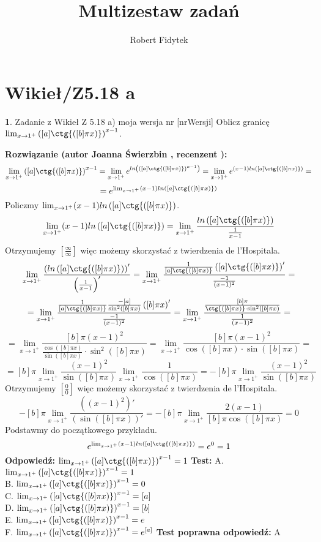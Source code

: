\documentclass[12pt, a4paper]{article}
\title{Multizestaw zadań}
\author{Robert Fidytek}
\date{}
\theoremstyle{definition} %
\newtheorem{zad}{}
\newcommand{\kategoria}[1]{\section{#1}} %
\newcommand{\zadStart}[1]{\begin{zad}#1\newline} %
\newcommand{\zadStop}{\end{zad}}   %
\newcommand{\rozwStart}[2]{\noindent \textbf{Rozwiązanie (autor #1 , recenzent #2): }\newline} %
\newcommand{\rozwStop}{\newline}                                            %
\newcommand{\odpStart}{\noindent \textbf{Odpowiedź:}\newline}    %
\newcommand{\odpStop}{\newline}                                             %
\newcommand{\testStart}{\noindent \textbf{Test:}\newline} %
\newcommand{\testStop}{\newline} %
\newcommand{\kluczStart}{\noindent \textbf{Test poprawna odpowiedź:}\newline} %
\newcommand{\kluczStop}{\newline} %
\begin{document}
\maketitle


\kategoria{Wikieł/Z5.18 a}
\zadStart{Zadanie z Wikieł Z 5.18 a) moja wersja nr [nrWersji]}
Oblicz granicę $\lim_{x \rightarrow 1^+} \left( [a] \ctg{([b] \pi x)} \right)^{x-1}$.
\zadStop
\rozwStart{Joanna Świerzbin}{}
$$ \lim_{x \rightarrow 1^+} \left( [a] \ctg{([b] \pi x)} \right)^{x-1} = \lim_{x \rightarrow 1^+} e^{ln \left(\left( [a] \ctg{([b] \pi x)} \right)^{x-1}\right)}
= \lim_{x \rightarrow 1^+} e^{(x-1) ln\left( [a] \ctg{([b] \pi x)} \right)}=$$
$$= e^{ \lim_{x \rightarrow 1^+} (x-1) ln\left( [a] \ctg{([b] \pi x)} \right)}$$
Policzmy $ \lim_{x \rightarrow 1^+} (x-1) ln\left( [a] \ctg{([b] \pi x)} \right)$.
$$\lim_{x \rightarrow 1^+} (x-1) ln\left( [a] \ctg{([b] \pi x)} \right) = \lim_{x \rightarrow 1^+} \frac{ln\left( [a] \ctg{([b] \pi x)} \right)}{\frac{1}{x-1}}$$
Otrzymujemy $ \left[ \frac{\infty}{\infty} \right] $ więc możemy skorzystać z twierdzenia de l'Hospitala.
$$\lim_{x \rightarrow 1^+} \frac{\left(ln\left( [a] \ctg{([b] \pi x)} \right)\right)'}{\left(\frac{1}{x-1}\right)'} = \lim_{x \rightarrow 1^+} \frac{\frac{1}{ [a] \ctg{([b] \pi x)}}\left( [a] \ctg{([b] \pi x)} \right)'}{\frac{-1}{(x-1)^2}}=$$
$$= \lim_{x \rightarrow 1^+} \frac{\frac{1}{ [a] \ctg{([b] \pi x)}}\frac{-[a]}{\sin^2([b] \pi x )}\left([b] \pi x\right)'}{\frac{-1}{(x-1)^2}}=
\lim_{x \rightarrow 1^+} \frac{\frac{[b] \pi}{ \ctg{([b] \pi x)} \cdot \sin^2([b] \pi x )}}{\frac{1}{(x-1)^2}}=$$
$$ = \lim_{x \rightarrow 1^+} \frac{[b] \pi (x-1)^2}{ \frac{\cos{([b] \pi x)}}{\sin([b] \pi x)} \cdot \sin^2([b] \pi x )}
= \lim_{x \rightarrow 1^+} \frac{[b] \pi (x-1)^2}{ \cos{([b] \pi x)} \cdot \sin([b] \pi x )}=$$
$$ =[b] \pi \lim_{x \rightarrow 1^+} \frac{(x-1)^2}{\sin([b] \pi x )}  \lim_{x \rightarrow 1^+} \frac{1}{\cos{([b] \pi x)}}=- [b] \pi \lim_{x \rightarrow 1^+} \frac{(x-1)^2}{\sin([b] \pi x )}$$
Otrzymujemy $ \left[ \frac{0}{0} \right] $ więc możemy skorzystać z twierdzenia de l'Hospitala.
$$- [b] \pi \lim_{x \rightarrow 1^+} \frac{\left((x-1)^2\right)'}{\left(\sin([b] \pi x )\right)'}= - [b] \pi \lim_{x \rightarrow 1^+} \frac{2(x-1)}{[b] \pi \cos([b] \pi x )} = 0 $$
Podstawmy do początkowego przykładu.
$$e^{ \lim_{x \rightarrow 1^+} (x-1) ln\left( [a] \ctg{([b] \pi x)} \right)} = e^0 = 1$$
\rozwStop
\odpStart
$\lim_{x \rightarrow 1^+} \left( [a] \ctg{([b] \pi x)} \right)^{x-1} = 1$
\odpStop
\testStart
A. $\lim_{x \rightarrow 1^+} \left( [a] \ctg{([b] \pi x)} \right)^{x-1} = 1$\\
B. $\lim_{x \rightarrow 1^+} \left( [a] \ctg{([b] \pi x)} \right)^{x-1} = 0$\\
C. $\lim_{x \rightarrow 1^+} \left( [a] \ctg{([b] \pi x)} \right)^{x-1} = [a]$\\
D. $\lim_{x \rightarrow 1^+} \left( [a] \ctg{([b] \pi x)} \right)^{x-1} = [b]$\\
E. $\lim_{x \rightarrow 1^+} \left( [a] \ctg{([b] \pi x)} \right)^{x-1} = e$\\
F. $\lim_{x \rightarrow 1^+} \left( [a] \ctg{([b] \pi x)} \right)^{x-1} = e^{[a]}$
\testStop
\kluczStart
A
\kluczStop
\end{document}
